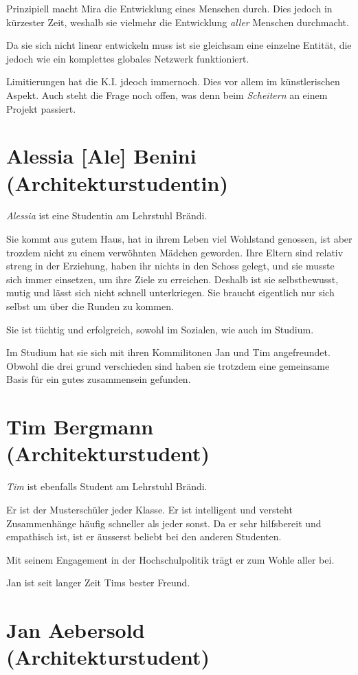 \documentclass[11pt,a4paper,ngerman]{scrreprt}
\begin{document}
Prinzipiell macht Mira die Entwicklung eines Menschen durch. Dies jedoch in
kürzester Zeit, weshalb sie vielmehr die Entwicklung \emph{aller} Menschen
durchmacht.

Da sie sich nicht linear entwickeln muss ist sie gleichsam eine einzelne
Entität, die jedoch wie ein komplettes globales Netzwerk funktioniert.

Limitierungen hat die K.I. jdeoch immernoch. Dies vor allem im künstlerischen
Aspekt. Auch steht die Frage noch offen, was denn beim \emph{Scheitern} an einem
Projekt passiert.

\section*{Alessia [Ale] Benini (Architekturstudentin)}

\emph{Alessia} ist eine Studentin am Lehrstuhl Brändi.

Sie kommt aus gutem Haus, hat in ihrem Leben viel Wohlstand genossen, ist aber
trozdem nicht zu einem verwöhnten Mädchen geworden. Ihre Eltern sind relativ
streng in der Erziehung, haben ihr nichts in den Schoss gelegt, und sie musste
sich immer einsetzen, um ihre Ziele zu erreichen. Deshalb ist sie selbstbewusst,
mutig und lässt sich nicht schnell unterkriegen. Sie braucht eigentlich nur sich
selbst um über die Runden zu kommen.

Sie ist tüchtig und erfolgreich, sowohl im Sozialen, wie auch im Studium.

Im Studium hat sie sich mit ihren Kommilitonen Jan und Tim angefreundet. Obwohl
die drei grund verschieden sind haben sie trotzdem eine gemeinsame Basis für ein
gutes zusammensein gefunden.

\section*{Tim Bergmann (Architekturstudent)}

\emph{Tim} ist ebenfalls Student am Lehrstuhl Brändi.

Er ist der Musterschüler jeder Klasse. Er ist intelligent und versteht
Zusammenhänge häufig schneller als jeder sonst. Da er sehr hilfsbereit und
empathisch ist, ist er äusserst beliebt bei den anderen Studenten.

Mit seinem Engagement in der Hochschulpolitik trägt er zum Wohle aller bei.

Jan ist seit langer Zeit Tims bester Freund.

\section*{Jan Aebersold (Architekturstudent)}
\end{document}
